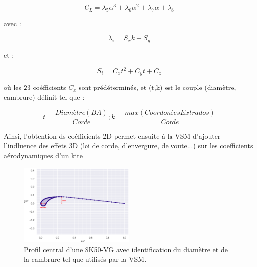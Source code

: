\documentclass[conference]{IEEEtran}
\begin{document}
\begin{center}
    \begin{equation}
        C_L = \lambda_5  \alpha^3 +\lambda_6  \alpha^2 + \lambda_7  \alpha + \lambda_8
        \label{eq:Cl_breukels}
    \end{equation}
\end{center}
avec :
\begin{center}
    \begin{equation}
        \lambda_i = S_x  k + S_y
        \label{eq:lamba_breukels}
    \end{equation}
\end{center}
et :
\begin{center}
    \begin{equation}
        S_i = C_x  t^2 + C_y  t + C_z
        \label{eq:S_breukels}
    \end{equation}
\end{center}
où les 23 coéfficients $C_x$ sont prédéterminés, et (t,k) est le couple (diamètre, cambrure) définit tel que :
\begin{center}
    \begin{equation}
        t = \frac{Diamètre(BA)}{Corde} ; k = \frac{max(CoordonéesExtrados)}{Corde}
        \label{eq:tk_breukels}
    \end{equation}
\end{center}

Ainsi, l'obtention ds coéfficients 2D permet ensuite à la VSM d'ajouter l'indluence des effets 3D (loi de corde, d'envergure, de voute...) sur les coefficients aérodynamiques d'un kite

\begin{figure}[H]
    \centering
    \includegraphics[width=0.5\textwidth]{Pics/airfoil.png}  
    \caption{Profil central d'une SK50-VG avec identification du diamètre et de la cambrure tel que utilisés par la VSM.}
    \label{fig:airfoil}
\end{figure}

\IEEEpeerreviewmaketitle
\end{document}
